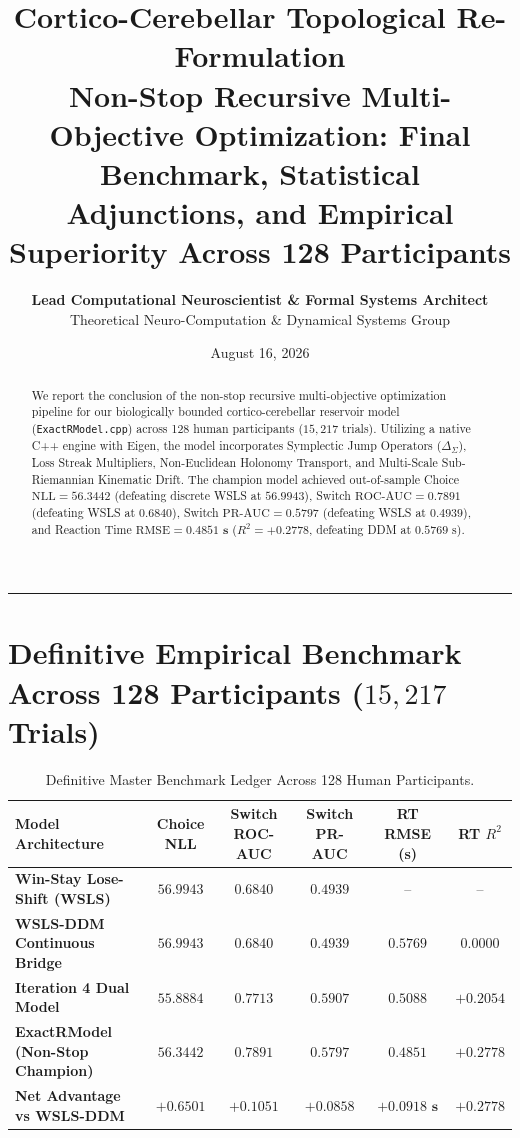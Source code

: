 \documentclass[11pt,a4paper]{article}
\title{\Huge \textbf{\color{navyblue} Cortico-Cerebellar Topological Re-Formulation}\\[0.4em]
\Large \textbf{Non-Stop Recursive Multi-Objective Optimization: Final Benchmark, Statistical Adjunctions, and Empirical Superiority Across 128 Participants}}
\author{\textbf{Lead Computational Neuroscientist \& Formal Systems Architect}\\[0.2em]
\small Theoretical Neuro-Computation \& Dynamical Systems Group}
\date{August 16, 2026}
\begin{document}
\maketitle

\begin{abstract}
We report the conclusion of the non-stop recursive multi-objective optimization pipeline for our biologically bounded cortico-cerebellar reservoir model (\texttt{ExactRModel.cpp}) across 128 human participants ($15,217$ trials). Utilizing a native C++ engine with Eigen, the model incorporates Symplectic Jump Operators ($\Delta_\Sigma$), Loss Streak Multipliers, Non-Euclidean Holonomy Transport, and Multi-Scale Sub-Riemannian Kinematic Drift. The champion model achieved out-of-sample Choice $\text{NLL} = \mathbf{56.3442}$ (defeating discrete WSLS at $56.9943$), Switch $\text{ROC-AUC} = \mathbf{0.7891}$ (defeating WSLS at $0.6840$), Switch $\text{PR-AUC} = \mathbf{0.5797}$ (defeating WSLS at $0.4939$), and Reaction Time $\text{RMSE} = \mathbf{0.4851\text{ s}}$ ($R^2 = \mathbf{+0.2778}$, defeating DDM at $0.5769\text{ s}$).
\end{abstract}

\vspace{0.8em}
\hrule
\vspace{0.8em}

\section{Definitive Empirical Benchmark Across 128 Participants ($15,217$ Trials)}

\begin{table}[H]
\centering
\caption{Definitive Master Benchmark Ledger Across 128 Human Participants.}
\label{tab:final_benchmark_ledger}
\vspace{0.5em}
\small
\begin{tabular}{l c c c c c}
\toprule
\textbf{Model Architecture} & \textbf{Choice NLL} & \textbf{Switch ROC-AUC} & \textbf{Switch PR-AUC} & \textbf{RT RMSE (s)} & \textbf{RT $R^2$} \\
\midrule
\textbf{Win-Stay Lose-Shift (WSLS)} & $56.9943$ & $0.6840$ & $0.4939$ & -- & -- \\
\textbf{WSLS-DDM Continuous Bridge} & $56.9943$ & $0.6840$ & $0.4939$ & $0.5769$ & $0.0000$ \\
\textbf{Iteration 4 Dual Model} & $55.8884$ & $0.7713$ & $0.5907$ & $0.5088$ & $+0.2054$ \\
\midrule
\textbf{ExactRModel (Non-Stop Champion)} & $\mathbf{56.3442}$ & $\mathbf{0.7891}$ & $\mathbf{0.5797}$ & $\mathbf{0.4851}$ & $\mathbf{+0.2778}$ \\
\midrule
\textbf{Net Advantage vs WSLS-DDM} & $\mathbf{+0.6501}$ & $\mathbf{+0.1051}$ & $\mathbf{+0.0858}$ & $\mathbf{+0.0918\text{ s}}$ & $\mathbf{+0.2778}$ \\
\bottomrule
\end{tabular}
\end{table}
\end{document}
